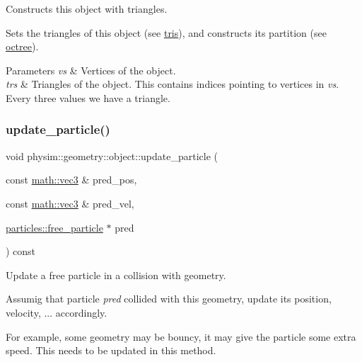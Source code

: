 Constructs this object with triangles. 

Sets the triangles of this object (see \hyperlink{classphysim_1_1geometry_1_1object_a90f3fe1ddb784923e9fd5ff8008b2a0b}{tris}), and constructs its partition (see \hyperlink{classphysim_1_1geometry_1_1object_acfaa1a79d6ea460ca98525e71ebb3d1e}{octree}). 
\begin{DoxyParams}{Parameters}
{\em vs} & Vertices of the object. \\
\hline
{\em trs} & Triangles of the object. This contains indices pointing to vertices in {\itshape vs}. Every three values we have a triangle. \\
\hline
\end{DoxyParams}
\mbox{\label{classphysim_1_1geometry_1_1object_a7d907cfc731a8ccd2f112e53efe81ab8}} 
\subsubsection{\texorpdfstring{update\+\_\+particle()}{update\_particle()}\hspace{0.1cm}{\footnotesize\ttfamily [1/4]}}
{\footnotesize\ttfamily void physim\+::geometry\+::object\+::update\+\_\+particle (\begin{DoxyParamCaption}\item[{const \hyperlink{structphysim_1_1math_1_1vec3}{math\+::vec3} \&}]{pred\+\_\+pos,  }\item[{const \hyperlink{structphysim_1_1math_1_1vec3}{math\+::vec3} \&}]{pred\+\_\+vel,  }\item[{\hyperlink{classphysim_1_1particles_1_1free__particle}{particles\+::free\+\_\+particle} $\ast$}]{pred }\end{DoxyParamCaption}) const\hspace{0.3cm}{\ttfamily [virtual]}}



Update a free particle in a collision with geometry. 

Assumig that particle {\itshape pred} collided with this geometry, update its position, velocity, ... accordingly.

For example, some geometry may be \textquotesingle{}bouncy\textquotesingle{}, it may give the particle some extra speed. This needs to be updated in this method.

